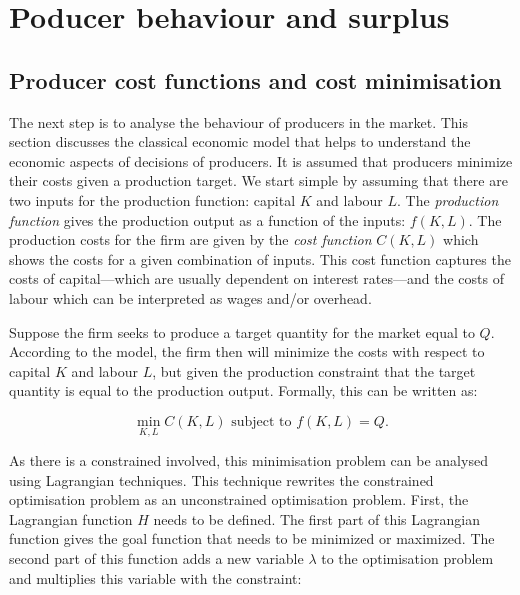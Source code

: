 \documentclass[
]{book}
\begin{document}
\hypertarget{poducer-behaviour-and-surplus}{%
\section{Poducer behaviour and surplus}\label{poducer-behaviour-and-surplus}}

\hypertarget{producer-cost-functions-and-cost-minimisation}{%
\subsection{Producer cost functions and cost minimisation}\label{producer-cost-functions-and-cost-minimisation}}

The next step is to analyse the behaviour of producers in the market. This section discusses the classical economic model that helps to understand the economic aspects of decisions of producers. It is assumed that producers minimize their costs given a production target. We start simple by assuming that there are two inputs for the production function: capital \(K\) and labour \(L\). The \emph{production function} gives the production output as a function of the inputs: \(f(K,L)\). The production costs for the firm are given by the \emph{cost function} \(C(K,L)\) which shows the costs for a given combination of inputs. This cost function captures the costs of capital---which are usually dependent on interest rates---and the costs of labour which can be interpreted as wages and/or overhead.

Suppose the firm seeks to produce a target quantity for the market equal to \(Q\). According to the model, the firm then will minimize the costs with respect to capital \(K\) and labour \(L\), but given the production constraint that the target quantity is equal to the production output. Formally, this can be written as:

\begin{equation}
\displaystyle{\min_{K,L}  C(K,L)} \text{ subject to }f(K,L) = Q.
\end{equation}

As there is a constrained involved, this minimisation problem can be analysed using Lagrangian techniques. This technique rewrites the constrained optimisation problem as an unconstrained optimisation problem. First, the Lagrangian function \(H\) needs to be defined. The first part of this Lagrangian function gives the goal function that needs to be minimized or maximized. The second part of this function adds a new variable \(\lambda\) to the optimisation problem and multiplies this variable with the constraint:
\end{document}
